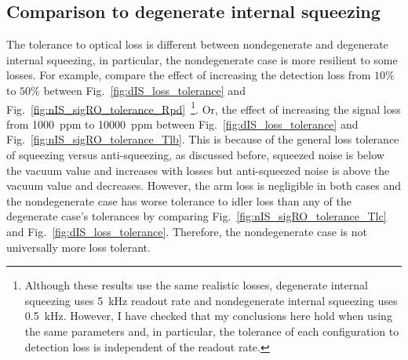 \subsection{Comparison to degenerate internal squeezing}

The tolerance to optical loss is different between nondegenerate and degenerate internal squeezing, in particular, the nondegenerate case is more resilient to some losses.
For example, compare the effect of increasing the detection loss from $10\%$ to $50\%$ between Fig.~\ref{fig:dIS_loss_tolerance} and Fig.~\ref{fig:nIS_sigRO_tolerance_Rpd}~\footnote{Although these results use the same realistic losses, degenerate internal squeezing uses 5~kHz readout rate and nondegenerate internal squeezing uses 0.5~kHz. However, I have checked that my conclusions here hold when using the same parameters and, in particular, the tolerance of each configuration to detection loss is independent of the readout rate.}. Or, the effect of increasing the signal loss from 1000~ppm to 10000~ppm between Fig.~\ref{fig:dIS_loss_tolerance} and Fig.~\ref{fig:nIS_sigRO_tolerance_Tlb}. 
This is because of the general loss tolerance of squeezing versus anti-squeezing, as discussed before, squeezed noise is below the vacuum value and increases with losses but anti-squeezed noise is above the vacuum value and decreases. %
However, the arm loss is negligible in both cases and the nondegenerate case has worse tolerance to idler loss than any of the degenerate case's tolerances by comparing Fig.~\ref{fig:nIS_sigRO_tolerance_Tlc} and Fig.~\ref{fig:dIS_loss_tolerance}. Therefore, the nondegenerate case is not universally more loss tolerant. %
